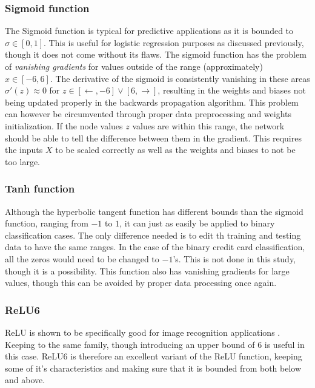         \subsubsection{Sigmoid function}
            The Sigmoid function is typical for predictive applications as it is bounded to $\sigma \in [0,1]$. This is useful for logistic regression purposes as discussed previously, though it does not come without its flaws. The sigmoid function has the problem of \textit{vanishing gradients} for values outside of the range (approximately) $x \in [-6,6]$. The derivative of the sigmoid is consistently vanishing in these areas $\sigma'(z)\approx 0$ for $z\in [\leftarrow, -6]\vee[6, \rightarrow]$, resulting in the weights and biases not being updated properly in the backwards propagation algorithm. This problem can however be circumvented through proper data preprocessing and weights initialization. If the node values $z$ values are within this range, the network should be able to tell the difference between them in the gradient. This requires the inputs $X$ to be scaled correctly as well as the weights and biases to not be too large.
        \subsubsection{Tanh function}
            Although the hyperbolic tangent function has different bounds than the sigmoid function, ranging from $-1$ to $1$, it can just as easily be applied to binary classification cases. The only difference needed is to edit th training and testing data to have the same ranges. In the case of the binary credit card classification, all the zeros would need to be changed to $-1$'s. This is not done in this study, though it is a possibility. This function also has vanishing gradients for large values, though this can be avoided by proper data processing once again. 
        \subsubsection{ReLU6}
            ReLU is shown to be specifically good for image recognition applications \cite{ReLUImagenet}. Keeping to the same family, though introducing an upper bound of $6$ is useful in this case. ReLU6 is therefore an excellent variant of the ReLU function, keeping some of it's characteristics and making sure that it is bounded from both below and above.
